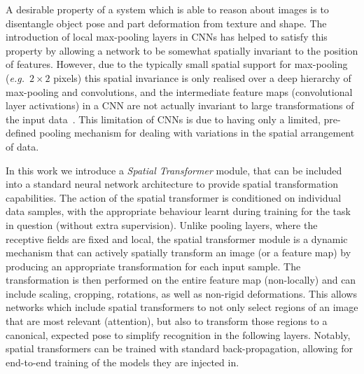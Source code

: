 \documentclass{article} %
\def\eg{\emph{e.g.}}
\begin{document}

A desirable property of a system which is able to reason about images is to disentangle
object pose and part deformation from texture and shape. The introduction of
local max-pooling layers in CNNs has helped to satisfy this property by
allowing a network to be somewhat spatially invariant to the
position of features. However, due to the typically small spatial
support for max-pooling (\eg~$2 \times 2$ pixels) this spatial
invariance is only realised over a deep hierarchy of max-pooling and
convolutions, and the intermediate feature maps (convolutional layer activations)
in a CNN are not actually invariant to large transformations of the input
data~\cite{Cohen15,Lenc14}. This limitation of CNNs is due to having
only a limited, pre-defined pooling mechanism for dealing with variations in the spatial
arrangement of data.

In this work we introduce a {\em Spatial Transformer} module, that can
be included into a standard neural network architecture to provide
spatial transformation capabilities. The action of the spatial transformer is
conditioned on individual data samples, with the appropriate behaviour learnt
during training for the task in question (without extra supervision).
Unlike pooling layers, where the
receptive fields are fixed and local, the spatial transformer module is a dynamic
mechanism that can actively spatially transform an image
(or a feature map) by producing an appropriate transformation for each input sample.
The transformation is then performed on the entire feature map (non-locally) and
can include scaling, cropping, rotations, as well as non-rigid deformations.
This allows networks which include spatial
transformers to not only select regions of an image
that are most relevant (attention), but also to transform those regions
to a canonical, expected pose to simplify recognition in the following layers.
Notably, spatial transformers can be trained with standard back-propagation,
allowing for end-to-end training of the models they are injected in.
\end{document}
